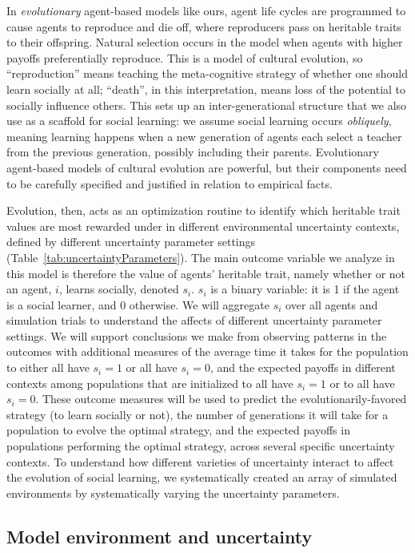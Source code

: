\documentclass[letterpaper,11.5pt]{scrartcl}
\begin{document}
In \emph{evolutionary} agent-based models like ours, agent life cycles are
programmed to cause agents to reproduce and die off, where reproducers pass on
heritable traits to their offspring. 
Natural selection occurs in the model when agents with higher
payoffs preferentially reproduce. This is a model of cultural evolution, so
``reproduction'' means teaching the meta-cognitive strategy of whether one should learn
socially at all; ``death'', in this interpretation, means
loss of the potential to socially influence others. 
This sets up an inter-generational structure
that we also use as a scaffold for social learning: we assume social learning occurs
\emph{obliquely}, meaning learning happens when a new
generation of agents each select a teacher from the previous generation, possibly
including their parents.  
Evolutionary agent-based models of cultural evolution are powerful, 
but their components need to be carefully specified and justified in relation to
empirical facts.

Evolution, then, acts as an optimization routine to identify which heritable trait
values are most rewarded under in different environmental uncertainty contexts,
defined by different uncertainty parameter settings
(Table~\ref{tab:uncertaintyParameters}).  The main outcome variable we analyze in
this model is therefore the value of agents' heritable trait, namely whether or not
an agent, $i$, learns socially, denoted $s_i$. $s_i$ is a binary variable: it is 1
if the agent is a social learner, and 0 otherwise. We will aggregate $s_i$ over all
agents and simulation trials to understand the affects of different uncertainty
parameter settings. We will support conclusions we make from observing patterns in
the outcomes with additional measures of the average time it takes for the
population to either all have $s_i = 1$ or all have $s_i = 0$, and the expected
payoffs in different contexts among populations that are initialized to all have
$s_i = 1$ or to all have $s_i = 0$. These outcome measures will be used to predict
the evolutionarily-favored strategy (to learn socially or not), the number of
generations it will take for a population to evolve the optimal strategy, and the
expected payoffs in populations performing the optimal strategy, across several specific
uncertainty contexts. To understand how different varieties of uncertainty interact
to affect the evolution of social learning, we systematically created an array of
simulated environments by systematically varying the uncertainty parameters. 


\subsection{Model environment and uncertainty}
\end{document}
